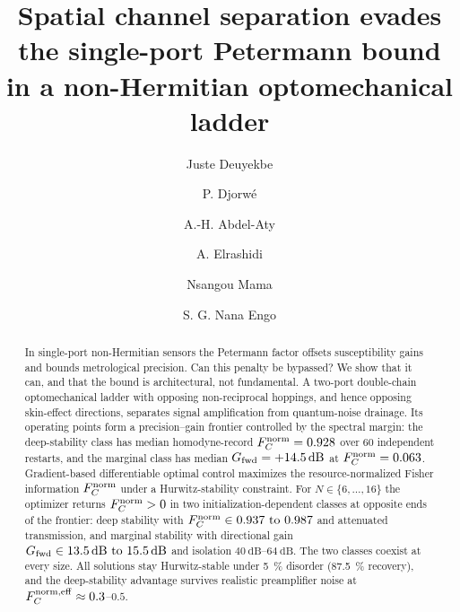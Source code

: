 \documentclass[aps,prxquantum,preprint,superscriptaddress,amsmath,amssymb]{revtex4-2}
\newcommand{\Fnorm}{F_C^{\rm norm}}
\newcommand{\Fnormeff}{F_C^{\rm norm,eff}}
\newcommand{\Gfwd}{G_{\rm fwd}}
\begin{document}
\title{Spatial channel separation evades the single-port Petermann bound in a non-Hermitian optomechanical ladder}

\author{Juste Deuyekbe}

\author{P. Djorw\'e}

\author{A.-H. Abdel-Aty}

\author{A. Elrashidi}

\author{Nsangou Mama}

\author{S. G. Nana Engo}

\begin{abstract}
In single-port non-Hermitian sensors the Petermann factor offsets susceptibility gains and bounds metrological precision. Can this penalty be bypassed? We show that it can, and that the bound is architectural, not fundamental. A two-port double-chain optomechanical ladder with opposing non-reciprocal hoppings, and hence opposing skin-effect directions, separates signal amplification from quantum-noise drainage. Its operating points form a precision--gain frontier controlled by the spectral margin: the deep-stability class has median homodyne-record $\Fnorm=\num{0.928}$ over \num{60} independent restarts, and the marginal class has median $\Gfwd=+\qty{14.5}{\dB}$ at $\Fnorm=\num{0.063}$. Gradient-based differentiable optimal control maximizes the resource-normalized Fisher information $\Fnorm$ under a Hurwitz-stability constraint. For $N\in\{\num{6},\dots,\num{16}\}$ the optimizer returns $\Fnorm>0$ in two initialization-dependent classes at opposite ends of the frontier: deep stability with $\Fnorm\in\numrange{0.937}{0.987}$ and attenuated transmission, and marginal stability with directional gain $\Gfwd\in\qtyrange{13.5}{15.5}{\dB}$ and isolation $\qtyrange{40}{64}{\dB}$. The two classes coexist at every size. All solutions stay Hurwitz-stable under \qty{5}{\percent} disorder (\qty{87.5}{\percent} recovery), and the deep-stability advantage survives realistic preamplifier noise at $\Fnormeff\approx\num{0.3}$--$\num{0.5}$.
\end{abstract}
\end{document}
